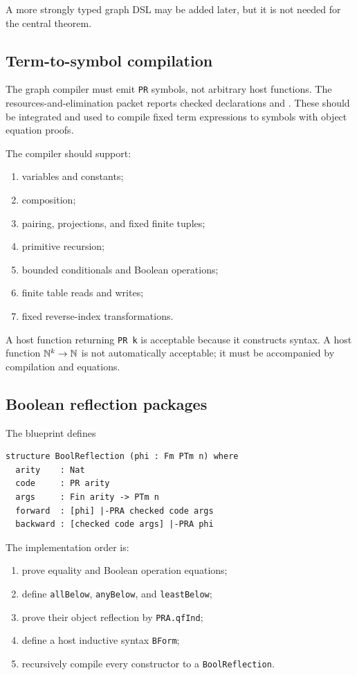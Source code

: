 A more strongly typed graph DSL may be added later, but it is not needed for
the central theorem.

\subsection{Term-to-symbol compilation}

The graph compiler must emit \texttt{PR} symbols, not arbitrary host
functions.  The resources-and-elimination packet reports checked declarations
 and
.  These should be integrated and
used to compile fixed term expressions to symbols with object equation proofs.

The compiler should support:
\begin{enumerate}
\item variables and constants;
\item composition;
\item pairing, projections, and fixed finite tuples;
\item primitive recursion;
\item bounded conditionals and Boolean operations;
\item finite table reads and writes;
\item fixed reverse-index transformations.
\end{enumerate}

A host function returning \texttt{PR k} is acceptable because it constructs
syntax.  A host function \(\mathbb{N}^k\to\mathbb{N}\) is not automatically acceptable; it
must be accompanied by compilation and equations.

\subsection{Boolean reflection packages}

The blueprint defines

\begin{lstlisting}[language={}]
structure BoolReflection (phi : Fm PTm n) where
  arity    : Nat
  code     : PR arity
  args     : Fin arity -> PTm n
  forward  : [phi] |-PRA checked code args
  backward : [checked code args] |-PRA phi
\end{lstlisting}

The implementation order is:

\begin{enumerate}
\item prove equality and Boolean operation equations;
\item define \texttt{allBelow}, \texttt{anyBelow}, and \texttt{leastBelow};
\item prove their object reflection by \texttt{PRA.qfInd};
\item define a host inductive syntax \texttt{BForm};
\item recursively compile every constructor to a \texttt{BoolReflection}.
\end{enumerate}

